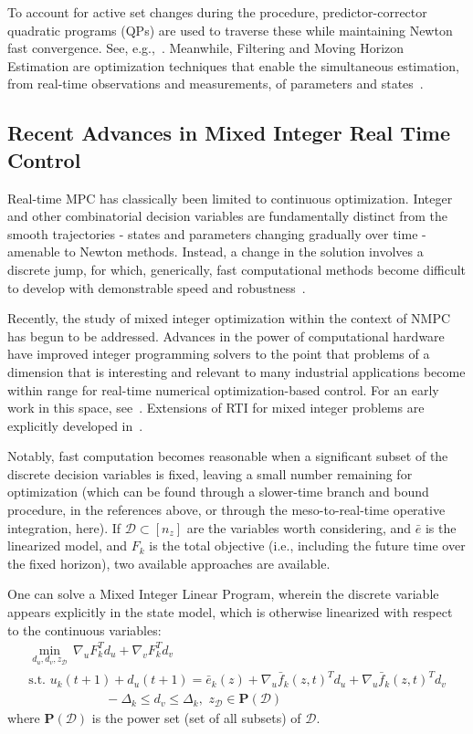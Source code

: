 \documentclass{article}
\newcommand{\1}{\mathds{1}}          %
\theoremstyle{definition}
\begin{document}
\begin{sloppypar}
To account for active set changes during the procedure, predictor-corrector quadratic programs (QPs) are used to traverse these while maintaining Newton fast convergence. See, e.g.,~\cite{kungurtsev2014sequential,kungurtsev2017predictor}. Meanwhile, Filtering and Moving Horizon Estimation are optimization techniques that enable the simultaneous estimation, from real-time observations and measurements, of parameters and states~\cite{rawlings2006particle}.  

\subsection{Recent Advances in Mixed Integer Real Time Control}

Real-time MPC has classically been limited to continuous optimization. Integer and other combinatorial decision variables are fundamentally distinct from the smooth trajectories - states and parameters changing gradually over time - amenable to Newton methods. Instead, a change in the solution involves a discrete jump, for which, generically, fast computational methods become difficult to develop with demonstrable speed and robustness~\cite{guddat1990parametric}.   

Recently, the study of mixed integer optimization within the context of NMPC has begun to be addressed. Advances in the power of computational hardware have improved integer programming solvers to the point that problems of a dimension that is interesting and relevant to many industrial applications become within range for real-time numerical optimization-based control. For an early work in this space, see~\cite{kirches2011fast}. Extensions of RTI for mixed integer problems are explicitly developed in~\cite{de2020real,quirynen2021sequential}. 

Notably, fast computation becomes reasonable when a significant subset of the discrete decision variables is fixed, leaving a small number remaining for optimization (which can be found through a slower-time branch and bound procedure, in the references above, or through the meso-to-real-time operative integration, here). If $\mathcal{D}\subset [n_z]$ are the variables worth considering, and $\bar{e}$ is the linearized model, and $F_k$ is the total objective (i.e., including the future time over the fixed horizon), two available approaches are available.

One can solve a Mixed Integer Linear Program, wherein the discrete variable appears explicitly in the state model, which is otherwise linearized with respect to the continuous variables:
\[
\begin{array}{l}
\min\limits_{d_u,d_v,z_{\mathcal{D}}}\, \nabla_{u} F_k^T d_u
+\nabla_{v} F_k^T d_v \\
\text{s.t.   } u_k(t+1)+d_u(t+1) = \bar e_k(z)+\nabla_u\bar{f}_k (z,t)^T d_u+\nabla_u\bar{f}_k (z,t)^T d_v\\
\qquad\qquad\qquad -\Delta_k \le d_v \le \Delta_k, \,\,z_{\mathcal{D}}\in \mathbf{P}(\mathcal{D})
\end{array}
\]
where $\mathbf{P}(\mathcal{D})$ is the power set (set of all subsets) of $\mathcal{D}$.


\end{sloppypar}
\end{document}
